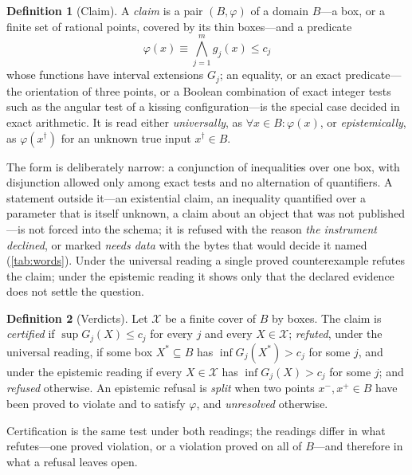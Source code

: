 \documentclass[preprint,11pt,a4paper]{elsarticle}
\theoremstyle{definition}
\newtheorem{definition}{Definition}
\begin{document}
\begin{definition}[Claim]\label{def:claim}
A \emph{claim} is a pair $(B,\varphi)$ of a domain $B$---a box, or a finite set of rational points, covered by its thin boxes---and a predicate
\begin{equation}\label{eq:claim}
\varphi(x)\equiv\bigwedge_{j=1}^m g_j(x)\le c_j
\end{equation}
whose functions have interval extensions $G_j$; an equality, or an exact predicate---the orientation of three points, or a Boolean combination of exact integer tests such as the angular test of a kissing configuration---is the special case decided in exact arithmetic. It is read either \emph{universally}, as $\forall x\in B:\varphi(x)$, or \emph{epistemically}, as $\varphi(x^\dagger)$ for an unknown true input $x^\dagger\in B$.
\end{definition}
The form is deliberately narrow: a conjunction of inequalities over one box, with disjunction allowed only among exact tests and no alternation of quantifiers. A statement outside it---an existential claim, an inequality quantified over a parameter that is itself unknown, a claim about an object that was not published---is not forced into the schema; it is refused with the reason \emph{the instrument declined}, or marked \emph{needs data} with the bytes that would decide it named (\cref{tab:words}). Under the universal reading a single proved counterexample refutes the claim; under the epistemic reading it shows only that the declared evidence does not settle the question.

\begin{definition}[Verdicts]\label{def:verdicts}
Let $\mathcal{X}$ be a finite cover of $B$ by boxes. The claim is \emph{certified} if $\sup G_j(X)\le c_j$ for every $j$ and every $X\in\mathcal{X}$; \emph{refuted}, under the universal reading, if some box $X^*\subseteq B$ has $\inf G_j(X^*)>c_j$ for some $j$, and under the epistemic reading if every $X\in\mathcal{X}$ has $\inf G_j(X)>c_j$ for some $j$; and \emph{refused} otherwise. An epistemic refusal is \emph{split} when two points $x^-,x^+\in B$ have been proved to violate and to satisfy $\varphi$, and \emph{unresolved} otherwise.
\end{definition}
Certification is the same test under both readings; the readings differ in what refutes---one proved violation, or a violation proved on all of $B$---and therefore in what a refusal leaves open.
\end{document}

